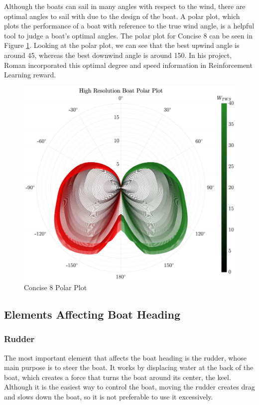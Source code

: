 \documentclass[12pt,twoside]{report}
\begin{document}
Although the boats can sail in many angles with respect to the wind, there are optimal angles to sail with due to the design of the boat. A polar plot, which plots the performance of a boat with reference to the true wind angle, is a helpful tool to judge a boat's optimal angles. The polar plot for Concise 8 can be seen in Figure \ref{fig:polar-plot}. Looking at the polar plot, we can see that the best upwind angle is around 45\degree, whereas the best downwind angle is around 150\degree. In his project, Roman incorporated this optimal degree and speed information in Reinforcement Learning reward.

\begin{figure}[h]
\centering
\includegraphics[width = 0.85\hsize]{figures/sailing/polar-plot.png}
\caption{Concise 8 Polar Plot \cite{stan}}
\label{fig:polar-plot}
\end{figure}

\subsection{Elements Affecting Boat Heading}
\subsubsection{Rudder}
The most important element that affects the boat heading is the rudder, whose main purpose is to steer the boat. It works by displacing water at the back of the boat, which creates a force that turns the boat around its center, the keel. Although it is the easiest way to control the boat, moving the rudder creates drag and slows down the boat, so it is not preferable to use it excessively.
\end{document}
